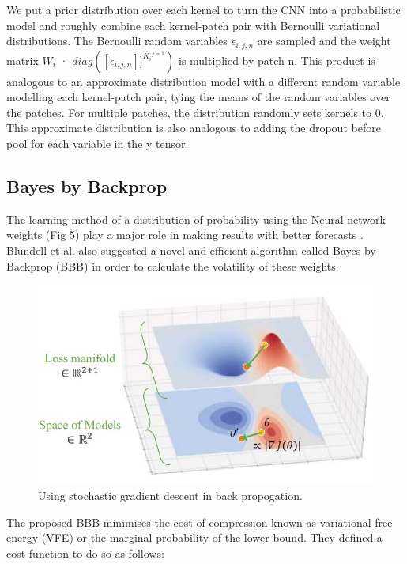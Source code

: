 \documentclass[journal]{IEEEtran}
\begin{document}
We put a prior distribution over each kernel to turn the CNN into
a probabilistic model and roughly combine each kernel-patch pair with Bernoulli variational distributions.
The Bernoulli random variables $\epsilon_{i,j,n}$ are sampled and the weight matrix
$W_i$ · $diag([\epsilon_{i,j,n}]]^{{K_i}^{j=1}})$ is multiplied by patch n.
This product is analogous to an approximate distribution model with a different random variable
modelling each kernel-patch pair, tying the means of the random variables over the patches.
For multiple patches, the distribution
randomly sets kernels to 0.
This approximate distribution is also analogous to adding the
dropout before pool for each variable in the y tensor. 

\subsection{Bayes by Backprop}

The learning method of a
distribution of probability using the Neural network weights (Fig 5) play a major role in making results with better forecasts \cite{lee2020gradients}. Blundell et al. also suggested a novel and efficient algorithm called Bayes by Backprop (BBB) in order to calculate the volatility of these weights. \cite{blundell2015weight}

\begin{figure}[ht]
  \centering
  \includegraphics[scale=0.55]{figures/gd.JPG}
  \caption{Using stochastic gradient descent in back propogation.\cite{lee2020gradients}}
\end{figure}

The proposed BBB minimises the cost of compression known as variational
free energy (VFE) or the marginal probability of the lower bound.
They defined a cost function
to do so as follows: 
\end{document}
